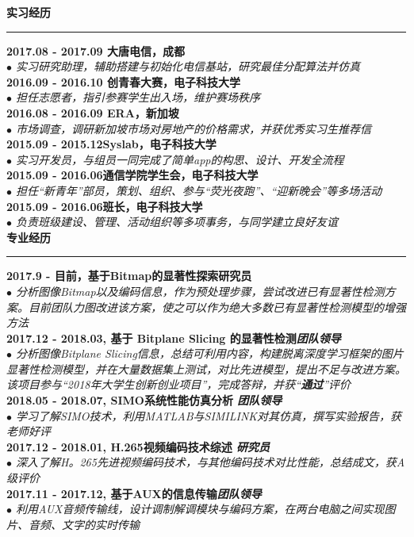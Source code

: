 \documentclass[a4paper,11pt,final]{memoir}
\newcommand{\myThemeColor}{RoyalBlue}
\newcommand{\SmallSep}{\vspace{0.9em}}
\newcommand{\CVSection}[1]
	{\Large\textbf{#1}\par
	\vspace{0.2cm}\normalsize\normalfont}
\newcommand{\CVItem}[1]
	{\textbf{\color{\myThemeColor} #1}}
\begin{document}
\begin{CJK*}{UTF8}{gbsn}
\CVSection{实习经历}
\hrule
\SmallSep
\CVItem{2017.08 - 2017.09 \hfill 大唐电信，成都}\\
\textit{$\bullet$ 实习研究助理，辅助搭建与初始化电信基站，研究最佳分配算法并仿真}
\\
\CVItem{2016.09 - 2016.10 \hfill 创青春大赛，电子科技大学}\\
\textit{$\bullet$ 担任志愿者，指引参赛学生出入场，维护赛场秩序}
\\
\CVItem{2016.08 - 2016.09 \hfill ERA，新加坡}\\
\textit{$\bullet$ 市场调查，调研新加坡市场对房地产的价格需求，并获优秀实习生推荐信} 
\\
\CVItem{2015.09 - 2015.12\hfill Syslab，电子科技大学}\\
\textit{$\bullet$ 实习开发员，与组员一同完成了简单app的构思、设计、开发全流程}
\\
\CVItem{2015.09 - 2016.06\hfill 通信学院学生会，电子科技大学}\\
\textit{$\bullet$ 担任“新青年”部员，策划、组织、参与“荧光夜跑”、“迎新晚会”等多场活动}
\\
\CVItem{2015.09 - 2016.06\hfill 班长，电子科技大学}\\
\textit{$\bullet$ 负责班级建设、管理、活动组织等多项事务，与同学建立良好友谊}
\\

\CVSection{专业经历}
\hrule
\SmallSep
\CVItem{2017.9 - 目前，基于Bitmap的显著性探索\hfill\emph{}研究员}\\
\textit{$\bullet$ 分析图像Bitmap以及编码信息，作为预处理步骤，尝试改进已有显著性检测方案。目前团队力图改进该方案，使之可以作为绝大多数已有显著性检测模型的增强方法} 
\\
\CVItem{2017.12 - 2018.03, 基于 Bitplane Slicing 的显著性检测\hfill\emph{团队领导}}\\
\textit{$\bullet$ 分析图像Bitplane Slicing信息，总结可利用内容，构建脱离深度学习框架的图片显著性检测模型，并在大量数据集上测试，对比先进模型，提出不足与改进方案。该项目参与“2018年大学生创新创业项目”，完成答辩，并获“\textbf{通过}”评价} 
\\
\CVItem{2018.05 - 2018.07, SIMO系统性能仿真分析 \hfill\emph{团队领导}}\\
\textit{$\bullet$ 学习了解SIMO技术，利用MATLAB与SIMILINK对其仿真，撰写实验报告，获老师好评} 
\\
\CVItem{2017.12 - 2018.01, H.265视频编码技术综述 \hfill\emph{研究员}}\\
\textit{$\bullet$ 深入了解H。265先进视频编码技术，与其他编码技术对比性能，总结成文，获A级评价} 
\\
\CVItem{2017.11 - 2017.12, 基于AUX的信息传输\hfill\emph{团队领导}}\\
\textit{$\bullet$ 利用AUX音频传输线，设计调制解调模块与编码方案，在两台电脑之间实现图片、音频、文字的实时传输}
\\


\end{CJK*}
\end{document}
